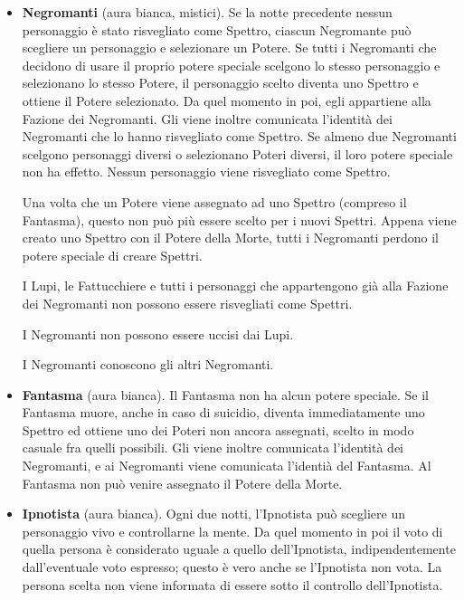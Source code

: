 \documentclass[a4paper,10pt]{article}
\begin{document}
\begin{itemize}

 \item {\bf Negromanti} (aura bianca, mistici). %
 Se la notte precedente nessun personaggio è stato risvegliato come Spettro, ciascun Negromante può scegliere un personaggio e selezionare un Potere.
 Se tutti i Negromanti che decidono di usare il proprio potere speciale scelgono lo stesso personaggio e selezionano lo stesso Potere, il personaggio scelto diventa uno Spettro e ottiene il Potere selezionato.
 Da quel momento in poi, egli appartiene alla Fazione dei Negromanti. Gli viene inoltre comunicata l'identità dei Negromanti che lo hanno risvegliato come Spettro.
 Se almeno due Negromanti scelgono personaggi diversi o selezionano Poteri diversi, il loro potere speciale non ha effetto. Nessun personaggio viene risvegliato come Spettro.
 
 Una volta che un Potere viene assegnato ad uno Spettro (compreso il Fantasma), questo non può più essere scelto per i nuovi Spettri. Appena viene creato uno Spettro con il Potere della Morte, tutti i Negromanti perdono il potere speciale di creare Spettri.
 
 I Lupi, le Fattucchiere e tutti i personaggi che appartengono già alla Fazione dei Negromanti non possono essere risvegliati come Spettri. %

 I Negromanti non possono essere uccisi dai Lupi.

 I Negromanti conoscono gli altri Negromanti.
 
 \item {\bf Fantasma} (aura bianca). Il Fantasma non ha alcun potere speciale. Se il Fantasma muore, anche in caso di suicidio, diventa immediatamente uno Spettro ed ottiene uno dei Poteri non ancora assegnati, scelto in modo casuale fra quelli possibili. Gli viene inoltre comunicata l'identità dei Negromanti, e ai Negromanti viene comunicata l'identià del Fantasma.
 Al Fantasma non può venire assegnato il Potere della Morte.
 
 \item {\bf Ipnotista} (aura bianca). Ogni due notti, l'Ipnotista può scegliere un personaggio vivo e controllarne la mente.
 Da quel momento in poi il voto di quella persona è considerato uguale a quello dell'Ipnotista, indipendentemente dall'eventuale voto espresso; questo è vero anche se l'Ipnotista non vota.
 La persona scelta non viene informata di essere sotto il controllo dell'Ipnotista.


\end{itemize}
\end{document}
